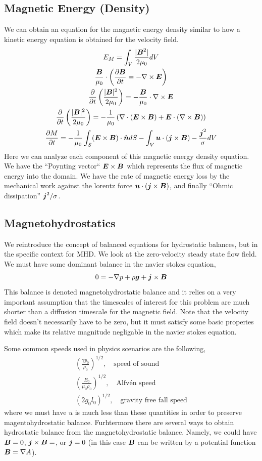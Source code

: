 \documentclass{article}
\begin{document}
\subsection{Magnetic Energy (Density)}
We can obtain an equation for the magnetic energy density similar to how a
kinetic energy equation is obtained for the velocity field.
\begin{gather*}
    E_M = \int_V\frac{|\boldsymbol{B}^2|}{2\mu_0}dV \\
    \frac{\boldsymbol{B}}{\mu_0} \cdot \left( \frac{\partial \boldsymbol{B}}{\partial t} = -\nabla\times\boldsymbol{E}\right)\\
    \frac{\partial }{\partial t}\left(\frac{|\boldsymbol{B}|^2}{2\mu_0}\right) =
    -\frac{\boldsymbol{B}}{\mu_0}\cdot\nabla\times\boldsymbol{E}\\
    \frac{\partial }{\partial t}\left(\frac{|\boldsymbol{B}|^2}{2\mu_0}\right) =
    -\frac{1}{\mu_0}\left(\nabla\cdot(\boldsymbol{E}\times\boldsymbol{B}) +
    \boldsymbol{E}\cdot(\nabla\times\boldsymbol{B})\right)\\
    \frac{\partial M}{\partial t} =
    -\frac{1}{\mu_0}\int_S(\boldsymbol{E}\times\boldsymbol{B})\cdot\hat{\boldsymbol{n}} dS - \int_V
    \boldsymbol{u}\cdot(\boldsymbol{j}\times\boldsymbol{B}) - \frac{\boldsymbol{j}^2}{\sigma} dV
\end{gather*}
Here we can analyze each component of this magnetic energy density equation. We
have the ``Poynting vector`` $\boldsymbol{E}\times\boldsymbol{B}$ which represents the flux of magnetic
energy into the domain. We have the rate of magnetic energy loss by the
mechanical work against the lorentz force $\boldsymbol{u}\cdot(\boldsymbol{j}\times\boldsymbol{B})$, and
finally ``Ohmic dissipation'' $\boldsymbol{j}^2/\sigma$. 


\subsection{Magnetohydrostatics}
We reintroduce the concept of balanced equations for hydrostatic balances, but
in the specific context for MHD. We look at the zero-velocity steady state flow
field. We must have some dominant balance in the navier stokes equation, 
\begin{gather*}
    0 = -\nabla p + \rho \boldsymbol{g} + \boldsymbol{j}\times\boldsymbol{B}
\end{gather*}
This balance is denoted magnetohydrostatic balance and it relies on a very
important assumption that the timescales of interest for this problem are much
shorter than a diffusion timescale for the magnetic field. Note that the
velocity field doesn't necessarily have to be zero, but it must satisfy some
basic properies which make its relative magnitude negligable in the navier
stokes equation. 

Some common speeds used in physics scenarios are the following,
\begin{gather*}
    \left(\frac{\gamma p_0}{\rho_0}\right)^{1/2}, \quad \text{speed of sound}\\
    \left(\frac{B_0}{\mu_0\rho_0}\right)^{1/2}, \quad \text{Alfv\'en speed}\\
    \left(2g_0l_0\right)^{1/2}, \quad \text{gravity free fall speed}
\end{gather*}
where we must have $u$ is much less than these quantities in order to preserve
magentohydrostatic balance. Furhtermore there are several ways to obtain
hydrostatic balance from the magnetohydrostatic balance. Namely, we could have
$\boldsymbol{B} = 0$, $\boldsymbol{j}\times\boldsymbol{B} = $, or $\boldsymbol{j} = 0$ (in this case $\boldsymbol{B}$ can be written by
a potential function $\boldsymbol{B} = \nabla A$). 
\end{document}
